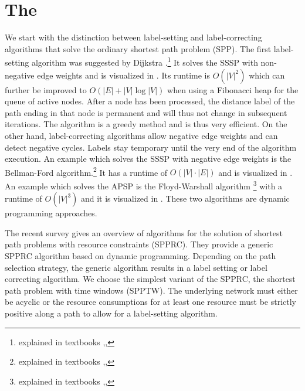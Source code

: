 \section{The }
We start with the distinction between label-setting \cite[ch. 4]{ahuja1993network} and label-correcting \cite[ch. 5]{ahuja1993network} algorithms that solve the ordinary shortest path problem (SPP).
The first label-setting algorithm was suggested by Dijkstra \cite{dijkstra1959note}.\footnote{explained in textbooks \cite[sec. 4.5]{ahuja1993network},\cite[sec. 24.3]{cormen2009introduction},\cite[sec. 3.7, p. 83]{jungnickel2013graphs}} It solves the SSSP with non-negative edge weights and is visualized in \cite{velden2014idp}. Its runtime is $O(|V|^2)$ which can further be improved to $O(|E| + |V| \log |V|)$ when using a Fibonacci heap for the queue of active nodes. After a node has been processed, the distance label of the path ending in that node is permanent and will thus not change in subsequent iterations. The algorithm is a greedy method and is thus very efficient.
On the other hand, label-correcting algorithms allow negative edge weights and can detect negative cycles. Labels stay temporary until the very end of the algorithm execution. An example which solves the SSSP with negative edge weights is the Bellman-Ford algorithm.\cite{bellman1958routing,ford1962flows}\footnote{explained in textbooks \cite[sec. 5.4]{ahuja1993network},\cite[sec. 24.1]{cormen2009introduction},\cite[sec. 3.7, p. 87]{jungnickel2013graphs}} It has a runtime of $O(|V|\cdot|E|)$ and is visualized in \cite{storz2013idp}. An example which solves the APSP is the Floyd-Warshall algorithm \cite{floyd1962algorithm,warshall1962theorem}\footnote{explained in textbooks \cite[sec. 5.6]{ahuja1993network},\cite[sec. 25.2]{cormen2009introduction},\cite[sec. 3.9]{jungnickel2013graphs}} with a runtime of $O(|V|^3)$ and it is visualized in \cite{becker2015idp}. These two algorithms are dynamic programming approaches. 

The recent survey \cite{irnich2005shortest} gives an overview of algorithms for the solution of shortest path problems with resource constraints (SPPRC). They provide a generic SPPRC algorithm based on dynamic programming. Depending on the path selection strategy, the generic algorithm results in a label setting or label correcting algorithm. We choose the simplest variant of the SPPRC, the shortest path problem with time windows (SPPTW). The underlying network must either be acyclic or the resource consumptions for at least one resource must be strictly positive along a path to allow for a label-setting algorithm. 

